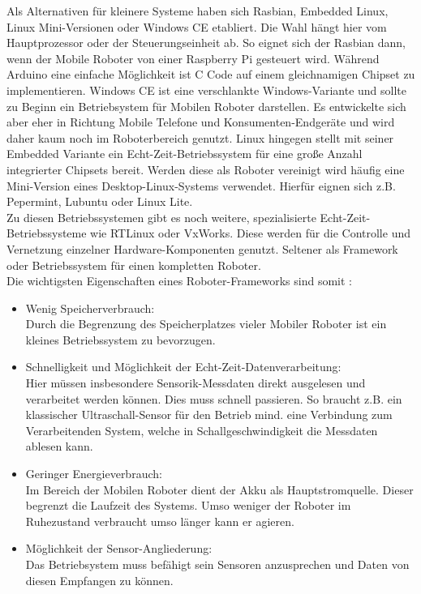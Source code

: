 \documentclass[twoside,12pt,a4paper]{report}
\begin{document}
	Als Alternativen für kleinere Systeme haben sich Rasbian, Embedded Linux, Linux Mini-Versionen oder Windows CE etabliert. Die Wahl hängt hier vom Hauptprozessor oder der Steuerungseinheit ab. So eignet sich der Rasbian dann, wenn der Mobile Roboter von einer Raspberry Pi gesteuert wird. Während Arduino eine einfache Möglichkeit ist C Code auf einem gleichnamigen Chipset zu implementieren. Windows CE ist eine verschlankte Windows-Variante und sollte zu Beginn ein Betriebsystem für Mobilen Roboter darstellen. Es entwickelte sich aber eher in Richtung Mobile Telefone und Konsumenten-Endgeräte und wird daher kaum noch im Roboterbereich genutzt. Linux hingegen stellt mit seiner Embedded Variante ein Echt-Zeit-Betriebssystem für eine große Anzahl integrierter Chipsets bereit. Werden diese als Roboter vereinigt wird häufig eine Mini-Version eines Desktop-Linux-Systems verwendet. Hierfür eignen sich z.B. Pepermint, Lubuntu oder Linux Lite.   \\
	Zu diesen Betriebssystemen gibt es noch weitere, spezialisierte Echt-Zeit-Betriebssysteme wie RTLinux oder VxWorks. Diese werden für die Controlle und Vernetzung einzelner Hardware-Komponenten genutzt. Seltener als Framework oder Betriebssystem für einen kompletten Roboter. \\
	
	Die wichtigsten Eigenschaften eines Roboter-Frameworks sind somit :
	\begin{itemize}
		\item Wenig Speicherverbrauch:\\
		Durch die Begrenzung des Speicherplatzes vieler Mobiler Roboter ist ein kleines Betriebssystem zu bevorzugen. 
		\item Schnelligkeit und Möglichkeit der Echt-Zeit-Datenverarbeitung: \\
		Hier müssen insbesondere Sensorik-Messdaten direkt ausgelesen und verarbeitet werden können. Dies muss schnell passieren. So braucht z.B. ein klassischer Ultraschall-Sensor für den Betrieb mind. eine Verbindung zum Verarbeitenden System, welche in Schallgeschwindigkeit die Messdaten ablesen kann. 
		\item Geringer Energieverbrauch:\\
		Im Bereich der Mobilen Roboter dient der Akku als Hauptstromquelle. Dieser begrenzt die Laufzeit des Systems. Umso weniger der Roboter im Ruhezustand verbraucht umso länger kann er agieren. 
		\item Möglichkeit der Sensor-Angliederung:\\
		Das Betriebsystem muss befähigt sein Sensoren anzusprechen und Daten von diesen Empfangen zu können.
	\end{itemize}
	
\end{document}
